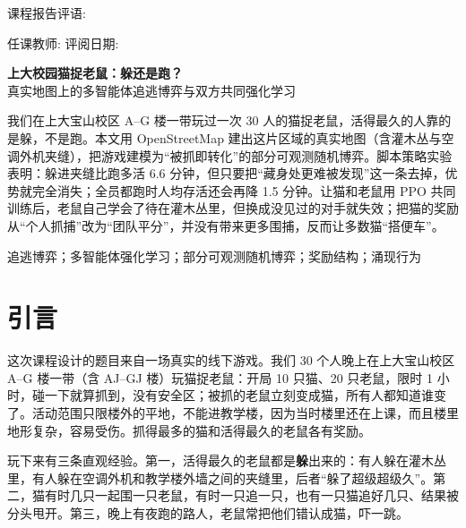 \documentclass[a4paper,zihao=5,fontset=fandol,UTF8]{ctexart}
\begin{document}
\vspace{6pt}
{\fontsize{12pt}{16pt}\selectfont\heiti 课程报告评语:}

\vfill
{\fontsize{12pt}{16pt}\selectfont\heiti 任课教师: \underline{\makebox[3cm]{}}\hfill 评阅日期: \underline{\makebox[2.6cm]{}}}
\vspace{1.5cm}
\newpage

\begin{center}
{\fontsize{22pt}{30pt}\selectfont\bfseries\heiti 上大校园猫捉老鼠：躲还是跑？}\\[6pt]
{\fontsize{12pt}{16pt}\selectfont\heiti 真实地图上的多智能体追逃博弈与双方共同强化学习}
\end{center}
\vspace{4pt}

%
我们在上大宝山校区 A–G 楼一带玩过一次 30 人的猫捉老鼠，活得最久的人靠的是躲，不是跑。本文用 OpenStreetMap 建出这片区域的真实地图（含灌木丛与空调外机夹缝），把游戏建模为“被抓即转化”的部分可观测随机博弈。脚本策略实验表明：躲进夹缝比跑多活 6.6 分钟，但只要把“藏身处更难被发现”这一条去掉，优势就完全消失；全员都跑时人均存活还会再降 1.5 分钟。让猫和老鼠用 PPO 共同训练后，老鼠自己学会了待在灌木丛里，但换成没见过的对手就失效；把猫的奖励从“个人抓捕”改为“团队平分”，并没有带来更多围捕，反而让多数猫“搭便车”。

\vspace{4pt}
追逃博弈；多智能体强化学习；部分可观测随机博弈；奖励结构；涌现行为

\vspace{8pt}

\section{引言}
这次课程设计的题目来自一场真实的线下游戏。我们 30 个人晚上在上大宝山校区 A–G 楼一带（含 AJ–GJ 楼）玩猫捉老鼠：开局 10 只猫、20 只老鼠，限时 1 小时，碰一下就算抓到，没有安全区；被抓的老鼠立刻变成猫，所有人都知道谁变了。活动范围只限楼外的平地，不能进教学楼，因为当时楼里还在上课，而且楼里地形复杂，容易受伤。抓得最多的猫和活得最久的老鼠各有奖励。

玩下来有三条直观经验。第一，活得最久的老鼠都是\textbf{躲}出来的：有人躲在灌木丛里，有人躲在空调外机和教学楼外墙之间的夹缝里，后者“躲了超级超级久”。第二，猫有时几只一起围一只老鼠，有时一只追一只，也有一只猫追好几只、结果被分头甩开。第三，晚上有夜跑的路人，老鼠常把他们错认成猫，吓一跳。
\end{document}
